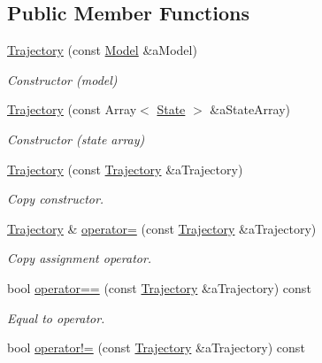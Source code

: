 \subsection*{Public Member Functions}
\begin{DoxyCompactItemize}
\item 
\hyperlink{classostk_1_1astro_1_1_trajectory_a9333200bd6afed5aef4f5aad8a2a8e84}{Trajectory} (const \hyperlink{classostk_1_1astro_1_1trajectory_1_1_model}{Model} \&a\+Model)
\begin{DoxyCompactList}\small\item\em Constructor (model) \end{DoxyCompactList}\item 
\hyperlink{classostk_1_1astro_1_1_trajectory_a5bffa48518940b06d353988efdeb098a}{Trajectory} (const Array$<$ \hyperlink{classostk_1_1astro_1_1trajectory_1_1_state}{State} $>$ \&a\+State\+Array)
\begin{DoxyCompactList}\small\item\em Constructor (state array) \end{DoxyCompactList}\item 
\hyperlink{classostk_1_1astro_1_1_trajectory_a2a7642fa6183da49b5def83f63f08c42}{Trajectory} (const \hyperlink{classostk_1_1astro_1_1_trajectory}{Trajectory} \&a\+Trajectory)
\begin{DoxyCompactList}\small\item\em Copy constructor. \end{DoxyCompactList}\item 
\hyperlink{classostk_1_1astro_1_1_trajectory}{Trajectory} \& \hyperlink{classostk_1_1astro_1_1_trajectory_aa8229045bd7cf0696b8cd235cc3837a8}{operator=} (const \hyperlink{classostk_1_1astro_1_1_trajectory}{Trajectory} \&a\+Trajectory)
\begin{DoxyCompactList}\small\item\em Copy assignment operator. \end{DoxyCompactList}\item 
bool \hyperlink{classostk_1_1astro_1_1_trajectory_a13b1a0621195ed85aa3df0da5ae935f2}{operator==} (const \hyperlink{classostk_1_1astro_1_1_trajectory}{Trajectory} \&a\+Trajectory) const
\begin{DoxyCompactList}\small\item\em Equal to operator. \end{DoxyCompactList}\item 
bool \hyperlink{classostk_1_1astro_1_1_trajectory_abb524dcee260456d546f5e01ee9c228c}{operator!=} (const \hyperlink{classostk_1_1astro_1_1_trajectory}{Trajectory} \&a\+Trajectory) const

\end{DoxyCompactItemize}
